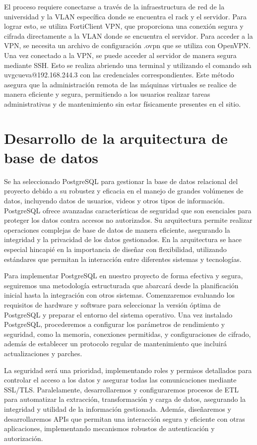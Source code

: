 El proceso requiere conectarse a través de la infraestructura de red de la universidad y la VLAN específica donde se encuentra el rack y el servidor. Para lograr esto, se utiliza FortiClient VPN, que proporciona una conexión segura y cifrada directamente a la VLAN donde se encuentra el servidor. Para acceder a la VPN, se necesita un archivo de configuración .ovpn que se utiliza con OpenVPN. Una vez conectado a la VPN, se puede acceder al servidor de manera segura mediante SSH. Esto se realiza abriendo una terminal y utilizando el comando ssh uvgcueva@192.168.244.3 con las credenciales correspondientes. Este método asegura que la administración remota de las máquinas virtuales se realice de manera eficiente y segura, permitiendo a los usuarios realizar tareas administrativas y de mantenimiento sin estar físicamente presentes en el sitio.

\section{Desarrollo de la arquitectura de base de datos}

Se ha seleccionado PostgreSQL para gestionar la base de datos relacional del proyecto debido a su robustez y eficacia en el manejo de grandes volúmenes de datos, incluyendo datos de usuarios, videos y otros tipos de información. PostgreSQL ofrece avanzadas características de seguridad que son esenciales para proteger los datos contra accesos no autorizados. Su arquitectura permite realizar operaciones complejas de base de datos de manera eficiente, asegurando la integridad y la privacidad de los datos gestionados. En la arquitectura se hace especial hincapié en la importancia de diseñar con flexibilidad, utilizando estándares que permitan la interacción entre diferentes sistemas y tecnologías.

Para implementar PostgreSQL en nuestro proyecto de forma efectiva y segura, seguiremos una metodología estructurada que abarcará desde la planificación inicial hasta la integración con otros sistemas. Comenzaremos evaluando los requisitos de hardware y software para seleccionar la versión óptima de PostgreSQL y preparar el entorno del sistema operativo. Una vez instalado PostgreSQL, procederemos a configurar los parámetros de rendimiento y seguridad, como la memoria, conexiones permitidas, y configuraciones de cifrado, además de establecer un protocolo regular de mantenimiento que incluirá actualizaciones y parches.

La seguridad será una prioridad, implementando roles y permisos detallados para controlar el acceso a los datos y asegurar todas las comunicaciones mediante SSL/TLS. Paralelamente, desarrollaremos y configuraremos procesos de ETL para automatizar la extracción, transformación y carga de datos, asegurando la integridad y utilidad de la información gestionada. Además, diseñaremos y desarrollaremos APIs que permitan una interacción segura y eficiente con otras aplicaciones, implementando mecanismos robustos de autenticación y autorización.

